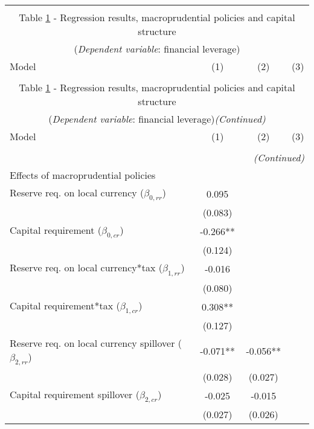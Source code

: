 \begin{longtable}{lccc}\\
	\label{reg:benchmark}\\
	\multicolumn{4}{c}{Table \ref{reg:benchmark} - Regression results, macroprudential policies and capital structure }\\
		\multicolumn{4}{c}{(\textit{Dependent variable}: financial leverage)}
	\\ \hline \hline
	Model & (1) & (2) & (3)  \\ \hline
	 &  &  &  \\ \endfirsthead
\multicolumn{4}{c}{Table \ref{reg:benchmark} - Regression results, macroprudential policies and capital structure }\\
\multicolumn{4}{c}{(\textit{Dependent variable}: financial leverage)\textit{(Continued)}}
\\ \hline \hline
Model & (1) & (2) & (3)  \\ \hline 
 &  &  &  \\ \endhead
  \hline
  \multicolumn{4}{r}{{\textit{(Continued)}}}\\ \endfoot

 \endlastfoot
 Effects of macroprudential policies  &  &  &  \\
\quad Reserve req. on local currency ($\beta_{0,rr}$) & 0.095 &  &  \\
 & (0.083) &  &  \\
\quad Capital requirement ($\beta_{0,cr}$) & -0.266** &  &  \\
 & (0.124) &  &  \\

\quad Reserve req. on local currency*tax ($\beta_{1,rr}$) & -0.016 &  &  \\
 & (0.080) &  &  \\
\quad Capital requirement*tax ($\beta_{1,cr}$)& 0.308** &  &  \\
 & (0.127) &  &  \\

\quad Reserve req. on local currency spillover ($\beta_{2,rr}$) & -0.071** & -0.056** &  \\
 & (0.028) & (0.027) &  \\
\quad Capital requirement spillover ($\beta_{2,cr}$) & -0.025 & -0.015 &  \\
 & (0.027) & (0.026) &  \\


\end{longtable}
